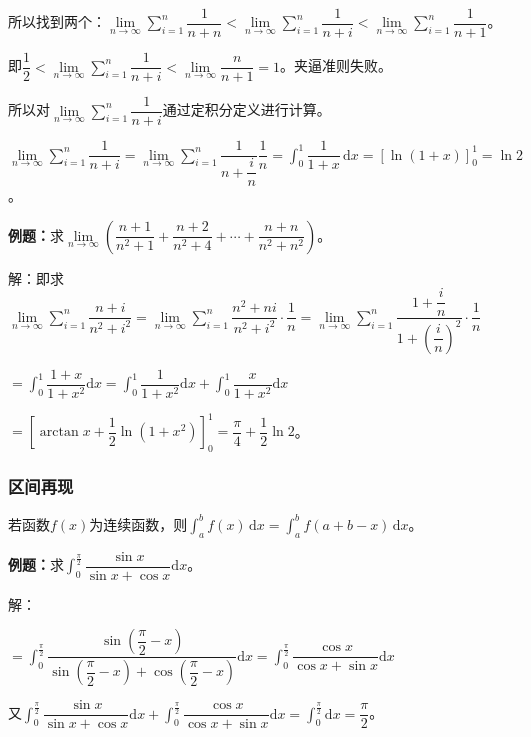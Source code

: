 \documentclass[UTF8, 12pt]{ctexart}
\begin{document}
所以找到两个：$\lim\limits_{n\to\infty}\sum\limits_{i=1}^n\dfrac{1}{n+n}<\lim\limits_{n\to\infty}\sum\limits_{i=1}^n\dfrac{1}{n+i}<\lim\limits_{n\to\infty}\sum\limits_{i=1}^n\dfrac{1}{n+1}$。

即$\dfrac{1}{2}<\lim\limits_{n\to\infty}\sum\limits_{i=1}^n\dfrac{1}{n+i}<\lim\limits_{n\to\infty}\dfrac{n}{n+1}=1$。夹逼准则失败。

所以对$\lim\limits_{n\to\infty}\sum\limits_{i=1}^n\dfrac{1}{n+i}$通过定积分定义进行计算。

$\lim\limits_{n\to\infty}\sum\limits_{i=1}^n\dfrac{1}{n+i}=\lim\limits_{n\to\infty}\sum\limits_{i=1}^n\dfrac{1}{n+\dfrac{i}{n}}\dfrac{1}{n}=\displaystyle{\int_0^1\dfrac{1}{1+x}\,\textrm{d}x}=[\ln(1+x)]_0^1=\ln2$。

\textbf{例题：}求$\lim\limits_{n\to\infty}\left(\dfrac{n+1}{n^2+1}+\dfrac{n+2}{n^2+4}+\cdots+\dfrac{n+n}{n^2+n^2}\right)$。

解：即求$\lim\limits_{n\to\infty}\sum\limits_{i=1}^n\dfrac{n+i}{n^2+i^2}=\lim\limits_{n\to\infty}\sum\limits_{i=1}^n\dfrac{n^2+ni}{n^2+i^2}\cdot\dfrac{1}{n}=\lim\limits_{n\to\infty}\sum\limits_{i=1}^n\dfrac{1+\dfrac{i}{n}}{1+\left(\dfrac{i}{n}\right)^2}\cdot\dfrac{1}{n}$

$=\displaystyle{\int_0^1\dfrac{1+x}{1+x^2}\textrm{d}x}=\displaystyle{\int_0^1\dfrac{1}{1+x^2}\textrm{d}x+\int_0^1\dfrac{x}{1+x^2}\textrm{d}x}$

$=\left[\arctan x+\dfrac{1}{2}\ln(1+x^2)\right]_0^1=\dfrac{\pi}{4}+\dfrac{1}{2}\ln2$。

\subsubsection{区间再现}

若函数$f(x)$为连续函数，则$\int_a^bf(x)\,\textrm{d}x=\int_a^bf(a+b-x)\,\textrm{d}x$。

\textbf{例题：}求$\displaystyle{\int_0^\frac{\pi}{2}\dfrac{\sin x}{\sin x+\cos x}\textrm{d}x}$。

解：


$=\displaystyle{\int_0^\frac{\pi}{2}\dfrac{\sin(\dfrac{\pi}{2}-x)}{\sin(\dfrac{\pi}{2}-x)+\cos(\dfrac{\pi}{2}-x)}\textrm{d}x=\int_0^\frac{\pi}{2}\dfrac{\cos x}{\cos x+\sin x}\textrm{d}x}$

又$\displaystyle{\int_0^\frac{\pi}{2}\dfrac{\sin x}{\sin x+\cos x}\textrm{d}x+\int_0^\frac{\pi}{2}\dfrac{\cos x}{\cos x+\sin x}\textrm{d}x}$$=\int_0^\frac{\pi}{2}\textrm{d}x=\dfrac{\pi}{2}$。
\end{document}
